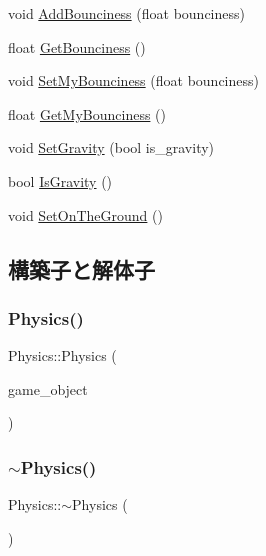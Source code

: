 \begin{DoxyCompactItemize}
\item 
void \mbox{\hyperlink{class_physics_af88191e5605a97952caefd19319b05f9}{Add\+Bounciness}} (float bounciness)
\item 
float \mbox{\hyperlink{class_physics_a5126745b31c45267ae516cc09a82fb5d}{Get\+Bounciness}} ()
\item 
void \mbox{\hyperlink{class_physics_a662185709961c64615c51ac5f32ab2ff}{Set\+My\+Bounciness}} (float bounciness)
\item 
float \mbox{\hyperlink{class_physics_acd6312afafb3faed57ba6450ed9ab9a6}{Get\+My\+Bounciness}} ()
\item 
void \mbox{\hyperlink{class_physics_a6f4c3f73eb1d2669ccc449b0d74f9d32}{Set\+Gravity}} (bool is\+\_\+gravity)
\item 
bool \mbox{\hyperlink{class_physics_a666e85a519fcb5f350a1f42273842f4d}{Is\+Gravity}} ()
\item 
void \mbox{\hyperlink{class_physics_a4e132f82ecc7f24200ec72213e2dc0c6}{Set\+On\+The\+Ground}} ()
\end{DoxyCompactItemize}


\subsection{構築子と解体子}
\mbox{\label{class_physics_a2e4cab77c53c0acf5273bd4986f8423d}} 
\subsubsection{\texorpdfstring{Physics()}{Physics()}}
{\footnotesize\ttfamily Physics\+::\+Physics (\begin{DoxyParamCaption}\item[{\mbox{\hyperlink{class_game_object_base}{Game\+Object\+Base}} $\ast$}]{game\+\_\+object }\end{DoxyParamCaption})}

\mbox{\label{class_physics_a045c3788e28059d3920136499942490f}} 
\subsubsection{\texorpdfstring{$\sim$\+Physics()}{~Physics()}}
{\footnotesize\ttfamily Physics\+::$\sim$\+Physics (\begin{DoxyParamCaption}{ }\end{DoxyParamCaption})}



